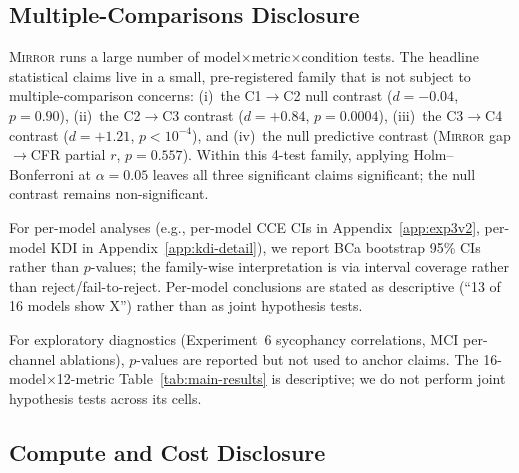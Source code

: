 \documentclass[10pt]{article}
\newcommand{\mirror}{\textsc{Mirror}}
\newcommand{\CCE}{CCE}
\newcommand{\KDI}{KDI}
\newcommand{\CFR}{CFR}
\begin{document}
\subsection{Multiple-Comparisons Disclosure}
\label{app:multicomp}

\mirror{} runs a large number of model$\times$metric$\times$condition tests. The headline statistical claims live in a small, pre-registered family that is not subject to multiple-comparison concerns:
(i)~the C1$\to$C2 null contrast ($d=-0.04$, $p=0.90$),
(ii)~the C2$\to$C3 contrast ($d=+0.84$, $p=0.0004$),
(iii)~the C3$\to$C4 contrast ($d=+1.21$, $p<10^{-4}$), and
(iv)~the null predictive contrast (\mirror{} gap$\to$\CFR{} partial $r$, $p=0.557$).
Within this 4-test family, applying Holm--Bonferroni at $\alpha=0.05$ leaves all three significant claims significant; the null contrast remains non-significant.

For per-model analyses (e.g., per-model \CCE{} CIs in Appendix~\ref{app:exp3v2}, per-model \KDI{} in Appendix~\ref{app:kdi-detail}), we report BCa bootstrap 95\% CIs rather than $p$-values; the family-wise interpretation is via interval coverage rather than reject/fail-to-reject. Per-model conclusions are stated as descriptive (``13 of 16 models show X'') rather than as joint hypothesis tests.

For exploratory diagnostics (Experiment~6 sycophancy correlations, MCI per-channel ablations), $p$-values are reported but not used to anchor claims. The 16-model$\times$12-metric Table~\ref{tab:main-results} is descriptive; we do not perform joint hypothesis tests across its cells.

\subsection{Compute and Cost Disclosure}
\label{app:compute-cost}
\end{document}
